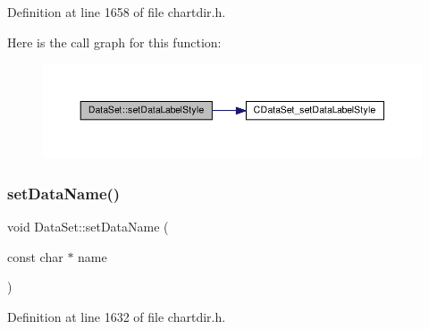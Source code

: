Definition at line 1658 of file chartdir.\+h.

Here is the call graph for this function\+:
\nopagebreak
\begin{figure}[H]
\begin{center}
\leavevmode
\includegraphics[width=350pt]{class_data_set_afecb7de8fdcaaa31e46e7ae6181a18f8_cgraph}
\end{center}
\end{figure}
\mbox{\label{class_data_set_a9a6419f8f676068219d9b55c45eb19c2}} 
\subsubsection{\texorpdfstring{set\+Data\+Name()}{setDataName()}}
{\footnotesize\ttfamily void Data\+Set\+::set\+Data\+Name (\begin{DoxyParamCaption}\item[{const char $\ast$}]{name }\end{DoxyParamCaption})\hspace{0.3cm}{\ttfamily [inline]}}



Definition at line 1632 of file chartdir.\+h.

